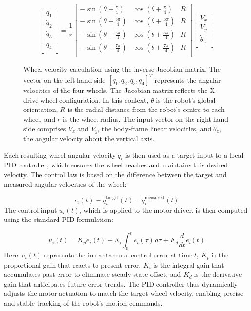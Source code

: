 \begin{figure}[H]
    \[
        \begin{bmatrix}
            \dot{q}_1 \\
            \dot{q}_2 \\
\dot{q}_3 \\
\dot{q}_4 \\
\end{bmatrix}
=
\frac{1}{r}
\begin{bmatrix}
    -\sin(\theta + \frac{\pi}{4}) & \cos(\theta + \frac{\pi}{4}) & R \\
    -\sin(\theta + \frac{3\pi}{4}) & \cos(\theta + \frac{3\pi}{4}) & R \\
    -\sin(\theta + \frac{5\pi}{4}) & \cos(\theta + \frac{5\pi}{4}) & R \\
    -\sin(\theta + \frac{7\pi}{4}) & \cos(\theta + \frac{7\pi}{4}) & R \\
\end{bmatrix}
\begin{bmatrix}
    V_x \\ 
    V_y \\
    \dot{\theta}_z \\
\end{bmatrix}
\]
\caption{Wheel velocity calculation using the inverse Jacobian matrix. The vector on the left-hand side \( [\dot{q}_1, \dot{q}_2, \dot{q}_3, \dot{q}_4]^T \) represents the angular velocities of the four wheels. The Jacobian matrix reflects the X-drive wheel configuration. In this context, \( \theta \) is the robot's global orientation, \( R \) is the radial distance from the robot's centre to each wheel, and \( r \) is the wheel radius. The input vector on the right-hand side comprises \( V_x \) and \( V_y \), the body-frame linear velocities, and \( \dot{\theta}_z \), the angular velocity about the vertical axis.}
\label{fig:matrix-wheel}
\end{figure}

Each resulting wheel angular velocity \( \dot{q}_i \) is then used as a target input to a local PID controller, which ensures the wheel reaches and maintains this desired velocity. The control law is based on the difference between the target and measured angular velocities of the wheel:

\[e_i(t) = \dot{q}_i^{\text{target}}(t) - \dot{q}_i^{\text{measured}}(t)\]
The control input \( u_i(t) \), which is applied to the motor driver, is then computed using the standard PID formulation:
    
\[u_i(t) = K_p e_i(t) + K_i \int_{0}^{t} e_i(\tau)\, d\tau + K_d \frac{d}{dt} e_i(t)\]
Here, \( e_i(t) \) represents the instantaneous control error at time \( t \), \( K_p \) is the proportional gain that reacts to present error, \( K_i \) is the integral gain that accumulates past error to eliminate steady-state offset, and \( K_d \) is the derivative gain that anticipates future error trends. The PID controller thus dynamically adjusts the motor actuation to match the target wheel velocity, enabling precise and stable tracking of the robot's motion commands.
